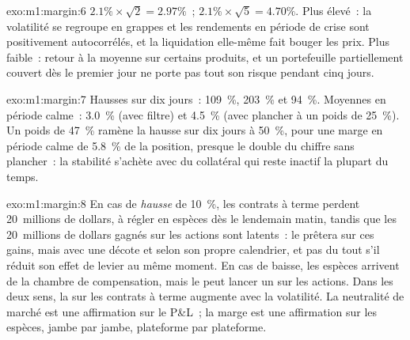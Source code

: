 \begin{solution}{exo:m1:margin:6}
$2.1\% \times \sqrt2 = 2.97\%$~; $2.1\% \times \sqrt5 = 4.70\%$. Plus élevé~: la volatilité
se regroupe en grappes et les rendements en période de crise sont positivement autocorrélés, et la
liquidation elle-même fait bouger les prix. Plus faible~: retour à la moyenne sur certains produits, et
un portefeuille partiellement couvert dès le premier jour ne porte pas tout son risque pendant
cinq jours.
\end{solution}

\begin{solution}{exo:m1:margin:7}
Hausses sur dix jours~: 109~\%, 203~\% et 94~\%. Moyennes en période calme~: 3.0~\% (avec filtre) et
4.5~\% (avec plancher à un poids de 25~\%). Un poids de 47~\% ramène la hausse sur dix jours
à 50~\%, pour une marge en période calme de 5.8~\% de la position, presque
le double du chiffre sans plancher~: la stabilité s'achète avec du collatéral qui reste
inactif la plupart du temps.
\end{solution}

\begin{solution}{exo:m1:margin:8}
En cas de \emph{hausse} de 10~\%, les contrats à terme perdent 20~millions de dollars, à régler en espèces dès le
lendemain matin, tandis que les 20~millions de dollars gagnés sur les actions sont latents~: le  prêtera sur ces gains, mais avec une décote et selon son propre calendrier, et pas du tout
s'il réduit son effet de levier au même moment. En cas de baisse, les espèces
arrivent de la chambre de compensation, mais le  peut lancer un  sur les
actions. Dans les deux sens, la  sur les contrats à terme augmente avec
la volatilité. La neutralité de marché est une affirmation sur le P\&L~; la marge est une affirmation
sur les espèces, jambe par jambe, plateforme par plateforme.
\end{solution}


